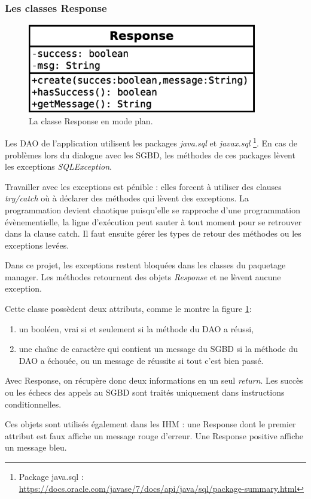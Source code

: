 \subsubsection{Les classes Response}
\begin{figure}[!h]
  \centering
  \includegraphics[width=10cm]{images/response.eps}
  \caption{La classe Response en mode plan.}
  \label{uml_classe_response}
\end{figure}

Les DAO de l'application utilisent les packages \textit{java.sql} et \textit{javax.sql}
\footnote{\label{paquetages_sql}Package java.sql : \url{https://docs.oracle.com/javase/7/docs/api/java/sql/package-summary.html}}.
En cas de problèmes lors du dialogue avec les SGBD, les méthodes de ces packages lèvent les exceptions \textit{SQLException}.

Travailler avec les exceptions est pénible : elles forcent à utiliser des clauses \textit{try/catch} où à déclarer des méthodes qui lèvent des exceptions.
La programmation devient chaotique puisqu'elle se rapproche d'une programmation évènementielle, la ligne d'exécution peut sauter à tout moment pour se retrouver dans la clause catch.
Il faut ensuite gérer les types de retour des méthodes ou les exceptions levées.

Dans ce projet, les exceptions restent bloquées dans les classes du paquetage manager.
Les méthodes retournent des objets \textit{Response} et ne lèvent aucune exception.

Cette classe possèdent deux attributs, comme le montre la figure \ref{uml_classe_response}:
\begin{enumerate}
\item un booléen, vrai si et seulement si la méthode du DAO a réussi,
\item une chaîne de caractère qui contient un message du SGBD si la méthode du DAO a échouée, ou un message de réussite si tout c'est bien passé.
\end{enumerate}

Avec Response, on récupère donc deux informations en un seul \textit{return}.
Les succès ou les échecs des appels au SGBD sont traités uniquement dans instructions conditionnelles.

Ces objets sont utilisés également dans les IHM : une Response dont le premier attribut est faux affiche un message rouge d'erreur.
Une Response positive affiche un message bleu.



